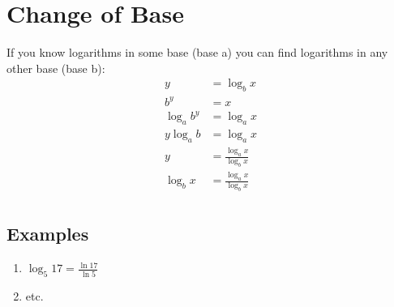 \documentclass{exam}
\begin{document}
  \section{Change of Base}

  If you know logarithms in some base (base a) you can find logarithms in any other base (base b):
  \begin{align*}
    y          &= \log_b x \\
    b^y        &= x \\
    \log_a b^y &= \log_a x \\
    y \log_a b &= \log_a x \\
    y          &= \frac{\log_a x}{\log_b x} \\
    \log_b x   &= \frac{\log_a x}{\log_b x} \\
  \end{align*}

  \subsection{Examples}

  \begin{enumerate}
    \item $\log_5 17 = \frac{\ln 17}{\ln 5}$ 
    \item etc.
  \end{enumerate}
\end{document}
